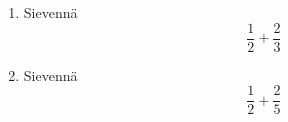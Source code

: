 \documentclass{article}
\begin{document}
\begin{enumerate}
\item
Sievennä
$$
\frac{1}{2}+\frac{2}{3}
$$
\item Sievennä
$$
\frac{1}{2}+\frac{2}{5}
$$
\end{enumerate}
\end{document}
